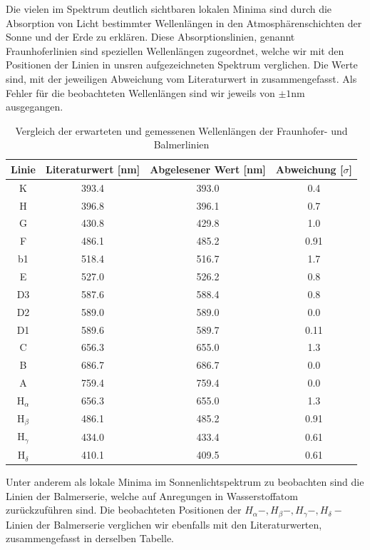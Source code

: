 Die vielen im Spektrum deutlich sichtbaren lokalen Minima sind durch die Absorption von Licht bestimmter Wellenlängen in den Atmosphärenschichten der Sonne und der Erde zu erklären. Diese Absorptionslinien, genannt \glqq{}Fraunhoferlinien\grqq{} sind speziellen Wellenlängen zugeordnet, welche wir mit den Positionen der Linien in unsren aufgezeichneten Spektrum verglichen. Die Werte sind, mit der jeweiligen Abweichung vom Literaturwert in  zusammengefasst. Als Fehler für die beobachteten Wellenlängen sind wir jeweils von $\pm 1\si{\nano\meter}$ ausgegangen.

\begin{table}[h]
  \centering
  \caption{Vergleich der erwarteten und gemessenen Wellenlängen der Fraunhofer- und Balmerlinien}
  \vspace*{0.5em}
  \begin{tabular}{c|c|c|c}
      \hline
      Linie & Literaturwert [nm] & Abgelesener Wert [nm] & Abweichung [$\sigma$] \\
      \hline
      K  & 393.4 & 393.0 & 0.4 \\
      H  & 396.8 & 396.1 & 0.7 \\
      G  & 430.8 & 429.8 & 1.0 \\
      F  & 486.1 & 485.2 & 0.91 \\
      b1 & 518.4 & 516.7 & 1.7 \\
      E  & 527.0 & 526.2 & 0.8 \\
      D3 & 587.6 & 588.4 & 0.8 \\
      D2 & 589.0 & 589.0 & 0.0 \\
      D1 & 589.6 & 589.7 & 0.11 \\
      C  & 656.3 & 655.0 & 1.3 \\
      B  & 686.7 & 686.7 & 0.0 \\
      A  & 759.4 & 759.4 & 0.0 \\
      \hline\hline
      $\mathrm{H}_{\alpha}$ & 656.3 & 655.0 & 1.3\\
      $\mathrm{H}_{\beta}$ & 486.1 & 485.2 & 0.91\\
      $\mathrm{H}_{\gamma}$ & 434.0 & 433.4 & 0.61\\
      $\mathrm{H}_{\delta}$ & 410.1 & 409.5 & 0.61\\
      \hline
  \end{tabular}
  \label{tab:fraunhofer_vergleich_zsmf}
\end{table}

Unter anderem als lokale Minima im Sonnenlichtspektrum zu beobachten sind die Linien der Balmerserie, welche auf Anregungen in Wasserstoffatom zurückzuführen sind. Die beobachteten Positionen der $H_{\alpha}-, H_{\beta}-, H_{\gamma}-, H_{\delta}-$Linien der Balmerserie verglichen wir ebenfalls mit den Literaturwerten, zusammengefasst in derselben Tabelle.

